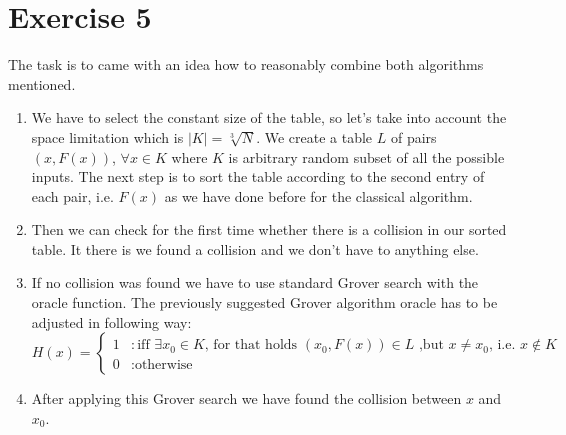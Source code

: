\documentclass[a4paper,10pt]{article}
\begin{document}
\section*{Exercise 5}
The task is to came with an idea how to reasonably combine both algorithms mentioned.

\begin{enumerate}[1]
\item 
We have to select the constant size of the table, so let's take into account the space limitation which is $\vert K \vert = \sqrt[3]{N}$. We create a table $L$ of pairs $(x,F(x))$, $\forall x \in K$ where $K$ is arbitrary random subset of all the possible inputs. The next step is to sort the table according to the second entry of each pair, i.e. $F(x)$ as we have done before for the classical algorithm.

\item
Then we can check for the first time whether there is a collision in our sorted table. It there is we found a collision and we don't have to anything else.

\item
If no collision was found we have to use standard Grover search with the oracle function. The previously suggested Grover algorithm oracle has to be adjusted in following way:
$$
H(x) = \left\{
  \begin{array}{ll}
    1 & : \text{iff }\exists x_0 \in K\text{, for that holds }(x_0, F(x))\in L\text{ ,but }x\neq x_0\text{, i.e. }x \notin K\\
    0 & : \text{otherwise}
  \end{array}
\right.
$$

\item
After applying this Grover search we have found the collision between $x$ and $x_0$.

\end{enumerate}
\end{document}
